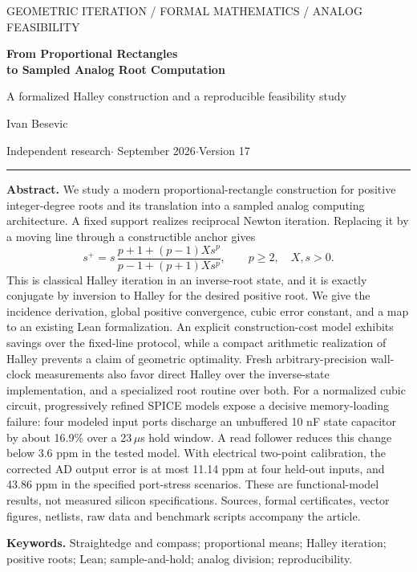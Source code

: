 \documentclass[11pt,a4paper]{article}
\theoremstyle{remark}\newtheorem{remark}[theorem]{Remark}
\numberwithin{equation}{section}
\begin{document}
\thispagestyle{empty}
{\small\sffamily\color{teal} GEOMETRIC ITERATION / FORMAL MATHEMATICS / ANALOG FEASIBILITY}\par
\vspace{8pt}
{\fontsize{25}{28}\selectfont\bfseries\color{ink} From Proportional Rectangles\\to Sampled Analog Root Computation\par}
\vspace{7pt}
{\large A formalized Halley construction and a reproducible feasibility study}\par
\vspace{10pt}
{\large Ivan Besevic}\par
{\small Independent research\quad$\cdot$ September 2026\quad$\cdot$\quad Version 17}
\vspace{9pt}\hrule\vspace{9pt}
\textbf{Abstract.}
We study a modern proportional-rectangle construction for positive integer-degree roots and its translation into a sampled analog computing architecture. A fixed support realizes reciprocal Newton iteration. Replacing it by a moving line through a constructible anchor gives
\[
 s^+=s\,\frac{p+1+(p-1)Xs^p}{p-1+(p+1)Xs^p},\qquad p\ge2,\quad X,s>0.
\]
This is classical Halley iteration in an inverse-root state, and it is exactly conjugate by inversion to Halley for the desired positive root. We give the incidence derivation, global positive convergence, cubic error constant, and a map to an existing Lean formalization. An explicit construction-cost model exhibits savings over the fixed-line protocol, while a compact arithmetic realization of Halley prevents a claim of geometric optimality. Fresh arbitrary-precision wall-clock measurements also favor direct Halley over the inverse-state implementation, and a specialized root routine over both. For a normalized cubic circuit, progressively refined SPICE models expose a decisive memory-loading failure: four modeled input ports discharge an unbuffered 10 nF state capacitor by about 16.9\% over a 23\,$\mu$s hold window. A read follower reduces this change below 3.6 ppm in the tested model. With electrical two-point calibration, the corrected AD output error is at most 11.14 ppm at four held-out inputs, and 43.86 ppm in the specified port-stress scenarios. These are functional-model results, not measured silicon specifications. Sources, formal certificates, vector figures, netlists, raw data and benchmark scripts accompany the article.

\vspace{4pt}
{\small\textbf{Keywords.} Straightedge and compass; proportional means; Halley iteration; positive roots; Lean; sample-and-hold; analog division; reproducibility.}
\end{document}
